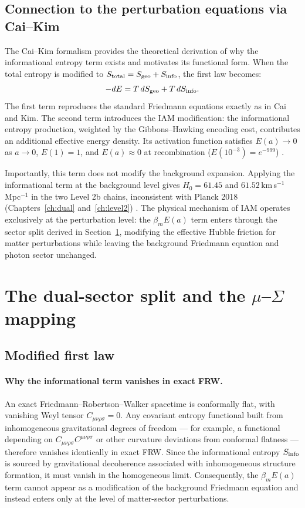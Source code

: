 \subsection{Connection to the perturbation equations via Cai--Kim}
The Cai--Kim formalism provides the theoretical derivation of why the informational entropy term exists and motivates its functional form. When the
total entropy is modified to $S_{\rm total}=S_{\rm geo}+S_{\rm info}$, the first law becomes:
\begin{equation}-dE=T\,dS_{\rm geo}+T\,dS_{\rm info}.\label{eq:th:firstlaw2}\end{equation}
The first term reproduces the standard Friedmann equations exactly as in Cai and Kim. The second term introduces the IAM modification: the
informational entropy production, weighted by the Gibbons--Hawking encoding cost, contributes an additional effective energy density. Its activation
function satisfies $E(a)\to0$ as $a\to0$, $E(1)=1$, and $E(a)\approx0$ at recombination ($E(10^{-3})=e^{-999}$) \calc.

Importantly, this term does not modify the background expansion. Applying the informational term at the background level gives
$H_0=61.45$ and $61.52$\,km\,s$^{-1}$\,Mpc$^{-1}$ in the two Level 2b chains, inconsistent with Planck 2018 (Chapters~\ref{ch:dual} and~\ref{ch:level2}) \measured. The physical
mechanism of IAM operates exclusively at the perturbation level: the $\beta_mE(a)$ term enters through the sector split derived in
Section~\ref{sec:th:split}, modifying the effective Hubble friction for matter perturbations while leaving the background Friedmann equation and photon sector
unchanged.

\section{The dual-sector split and the $\mu$--$\Sigma$ mapping}\label{sec:th:split}
\subsection{Modified first law}
\paragraph{Why the informational term vanishes in exact FRW.} An exact Friedmann--Robertson--Walker spacetime is conformally flat, with vanishing
Weyl tensor $C_{\mu\nu\rho\sigma}=0$. Any covariant entropy functional built from inhomogeneous gravitational degrees of freedom --- for example, a
functional depending on $C_{\mu\nu\rho\sigma}C^{\mu\nu\rho\sigma}$ or other curvature deviations from conformal flatness --- therefore vanishes
identically in exact FRW. Since the informational entropy $S_{\rm info}$ is sourced by gravitational decoherence associated with inhomogeneous
structure formation, it must vanish in the homogeneous limit. Consequently, the $\beta_mE(a)$ term cannot appear as a modification of the background
Friedmann equation and instead enters only at the level of matter-sector perturbations. \derived

